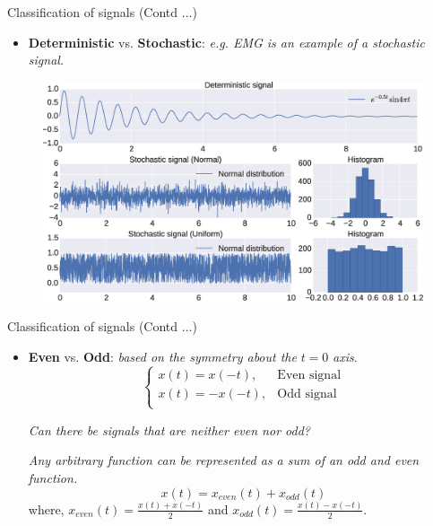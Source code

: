 \documentclass{beamer}
\begin{document}
\begin{frame}{Classification of signals (Contd ...)}
\begin{itemize}
\item \textbf{Deterministic} vs. \textbf{Stochastic}: \textit{e.g. EMG is an example of a stochastic signal.}
\end{itemize}
\begin{figure}
\includegraphics[width=\textwidth]{img/det_stoch.eps}
\end{figure}
\end{frame}

\begin{frame}{Classification of signals (Contd ...)}
\begin{itemize}
\item \textbf{Even} vs. \textbf{Odd}: \textit{based on the symmetry about the} $t=0$ \textit{axis}.
\[\begin{cases}
x(t) = x(-t), & \text{Even signal} \\
x(t) = -x(-t), & \text{Odd signal} \\
\end{cases}\]

\textit{Can there be signals that are neither even nor odd?}

\begin{tcolorbox}[width=0.9\textwidth,colback={lightgray},title={\textbf{Theorem}},colbacktitle=black,coltitle=white]
\textit{Any arbitrary function can be represented as a sum of an odd and even function.}
\[ x(t) = x_{even}(t) + x_{odd}(t) \]
where, $ x_{even}(t) = \frac{x(t) + x(-t)}{2} $ and $ x_{odd}(t) = \frac{x(t) - x(-t)}{2} $.
\end{tcolorbox}
\end{itemize}
\end{frame}
\end{document}
